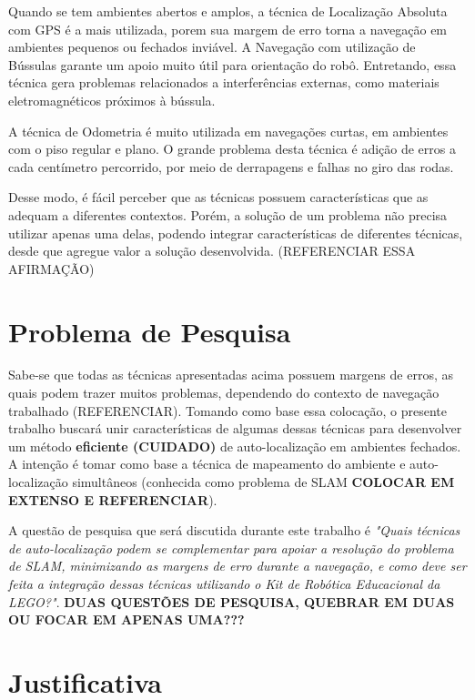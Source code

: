 	Quando se tem ambientes abertos e amplos, a técnica de Localização Absoluta com GPS é a mais utilizada, porem sua margem de erro torna a navegação em ambientes pequenos ou fechados inviável. A Navegação com utilização de Bússulas garante um apoio muito útil para orientação do robô. Entretando, essa técnica gera problemas relacionados a interferências externas, como materiais eletromagnéticos próximos à bússula.
	
	A técnica de Odometria é muito utilizada em navegações curtas, em ambientes com o piso regular e plano. O grande problema desta técnica é adição de erros a cada centímetro percorrido, por meio de derrapagens e falhas no giro das rodas. 

	Desse modo, é fácil perceber que as técnicas possuem características que as adequam a diferentes contextos. Porém, a solução de um problema não precisa utilizar apenas uma delas, podendo integrar características de diferentes técnicas, desde que agregue valor a solução desenvolvida. (REFERENCIAR ESSA AFIRMAÇÃO)

\section{Problema de Pesquisa}

	Sabe-se que todas as técnicas apresentadas acima possuem margens de erros, as quais podem trazer muitos problemas, dependendo do contexto de navegação trabalhado (REFERENCIAR). Tomando como base essa colocação, o presente trabalho buscará unir características de algumas dessas técnicas para desenvolver um método \textbf{eficiente (CUIDADO)} de auto-localização em ambientes fechados. A intenção é tomar como base a técnica de mapeamento do ambiente e auto-localização simultâneos (conhecida como problema de SLAM \textbf{COLOCAR EM EXTENSO E REFERENCIAR}).

	A questão de pesquisa que será discutida durante este trabalho é \textit{"Quais técnicas de auto-localização podem se complementar para apoiar a resolução do problema de SLAM, minimizando as margens de erro durante a navegação, e como deve ser feita a integração dessas técnicas utilizando o Kit de Robótica Educacional da LEGO?"}. \textbf{DUAS QUESTÕES DE PESQUISA, QUEBRAR EM DUAS OU FOCAR EM APENAS UMA???}

\section{Justificativa}

